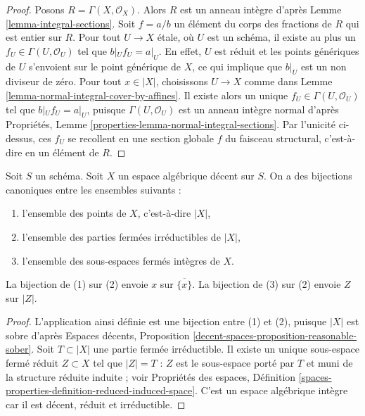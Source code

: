 \begin{proof}
Posons $R = \Gamma(X, \mathcal{O}_X)$. Alors $R$ est un anneau intègre d'après
Lemme \ref{lemma-integral-sections}.
Soit $f = a/b$ un élément du corps des fractions de $R$
qui est entier sur $R$.
Pour tout $U \to X$ \'etale, où $U$ est un schéma, il existe au plus un
$f_U \in \Gamma(U, \mathcal{O}_U)$ tel que $b|_U f_U = a|_U$.
En effet, $U$ est réduit et les points génériques de $U$ s'envoient sur
le point générique de $X$, ce qui implique que $b|_U$ est un
non diviseur de zéro.
Pour tout $x \in |X|$, choisissons $U \to X$ comme dans
Lemme \ref{lemma-normal-integral-cover-by-affines}.
Il existe alors un unique $f_U \in \Gamma(U, \mathcal{O}_U)$
tel que $b|_U f_U = a|_U$, puisque
$\Gamma(U, \mathcal{O}_U)$ est un anneau intègre normal d'après
Propriétés, Lemme \ref{properties-lemma-normal-integral-sections}.
Par l'unicité ci-dessus, ces $f_U$
se recollent en une section globale $f$ du faisceau
structural, c'est-à-dire en un élément de $R$.
\end{proof}

\begin{lemma}
\label{lemma-decent-irreducible-closed}
Soit $S$ un schéma. Soit $X$ un espace algébrique décent sur $S$.
On a des bijections canoniques entre les ensembles suivants :
\begin{enumerate}
\item l'ensemble des points de $X$, c'est-à-dire $|X|$,
\item l'ensemble des parties fermées irréductibles de $|X|$,
\item l'ensemble des sous-espaces fermés intègres de $X$.
\end{enumerate}
La bijection de (1) sur (2) envoie $x$ sur $\overline{\{x\}}$.
La bijection de (3) sur (2) envoie $Z$ sur $|Z|$.
\end{lemma}

\begin{proof}
L'application ainsi définie est une bijection entre (1) et (2), puisque $|X|$ est
sobre d'après
Espaces décents, Proposition \ref{decent-spaces-proposition-reasonable-sober}.
Soit $T \subset |X|$ une partie fermée irréductible. Il existe un
unique sous-espace fermé réduit $Z \subset X$ tel que
$|Z| = T$ : $Z$ est le sous-espace porté par $T$ et muni de la structure réduite
induite ; voir Propriétés des espaces, Définition
\ref{spaces-properties-definition-reduced-induced-space}.
C'est un espace algébrique intègre car il est décent,
réduit et irréductible.
\end{proof}






